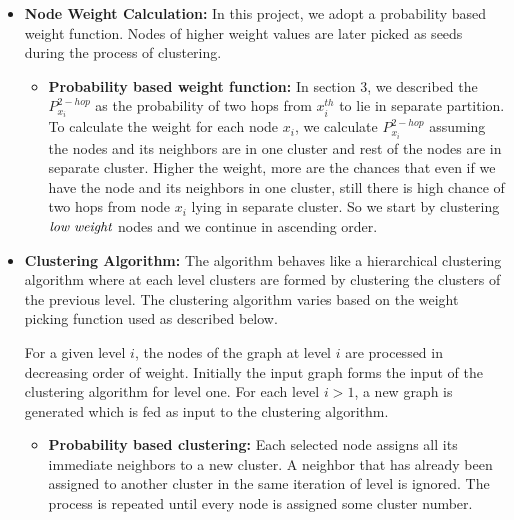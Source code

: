 \documentclass[letterpaper]{article}
\begin{document}
\begin{itemize} %

\item \textbf{Node Weight Calculation:} In this project, we adopt a probability based weight function. 
Nodes of higher weight values are later picked as seeds during the process of clustering. 

\begin{itemize} %

\item \textbf{Probability based weight function:}  
In section 3, we described the $P_{x_i}^{2-hop}$ as the probability of two hops from $x_i^{th}$ to lie in separate
partition. To calculate the weight for each node $x_i$, we calculate $P_{x_i}^{2-hop}$ assuming the nodes and its 
neighbors are in one cluster and rest of the nodes are in separate cluster. Higher the weight, more are the
chances that even if we have the node and its neighbors in one cluster, still there is high chance of two hops
from node $x_i$ lying in separate cluster. So we start by clustering $\emph{low weight}$ nodes and we continue
 in ascending order.
 


\end{itemize} %



\item \textbf{Clustering Algorithm:} The algorithm behaves like a hierarchical clustering algorithm where at each level clusters are formed by clustering the clusters of the previous level. The clustering algorithm varies based on the weight picking function used as described below.



For a given level $i$, the nodes of the graph at level $i$ are processed in decreasing order of weight. Initially the input graph forms the input of the clustering algorithm for level one. For each level $i >1$, a new graph is generated which is fed as input to the clustering algorithm.

\begin{itemize} %

\item \textbf{Probability based clustering:} Each selected node assigns all its immediate neighbors to a new cluster. 
A neighbor that has already been assigned to another cluster in the same iteration of level is ignored. 
The process is repeated until every node is assigned some cluster number.




\end{itemize}
\end{itemize}
\end{document}
